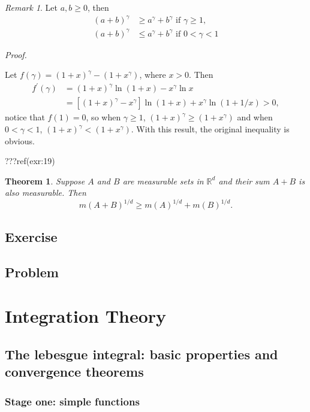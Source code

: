 \documentclass[
]{book}
\newtheorem{theorem}{Theorem}[chapter]
\theoremstyle{definition}
\theoremstyle{definition}
\theoremstyle{definition}
\theoremstyle{definition}
\theoremstyle{remark}
\newtheorem*{remark}{Remark}
\begin{document}
\begin{remark}
\leavevmode

Let \(a,b\ge0\), then
\[
\begin{aligned}
(a+b)^\gamma&\ge a^\gamma+b^\gamma\text{ if }\gamma\ge 1,\\
(a+b)^\gamma&\le a^\gamma+b^\gamma\text{ if }0<\gamma< 1
\end{aligned}
\]

\emph{Proof.}

Let \(f(\gamma)=(1+x)^\gamma-(1+x^\gamma)\), where \(x> 0\). Then
\[
\begin{aligned}
f^\prime (\gamma)&=(1+x)^\gamma\ln(1+x)-x^\gamma\ln x\\
&=[(1+x)^\gamma-x^\gamma]\ln(1+x)+x^\gamma\ln(1+1/x)>0,
\end{aligned}
\]
notice that \(f(1)=0\), so when \(\gamma\ge 1\), \((1+x)^\gamma\ge(1+x^\gamma)\) and when \(0<\gamma< 1\), \((1+x)^\gamma<(1+x^\gamma)\). With this result, the original inequality is obvious.

\end{remark}

???ref(exr:19)

\begin{theorem}
Suppose \(A\) and \(B\) are measurable sets in \(\mathbb{R}^d\) and their sum \(A+B\) is also measurable. Then
\[
m(A+B)^{1/d}\ge m(A)^{1/d}+m(B)^{1/d}.
\]
\end{theorem}

\section{Exercise}\label{exercise}

\section{Problem}\label{problem}

\chapter{Integration Theory}\label{ch2}

\section{The lebesgue integral: basic properties and convergence theorems}\label{the-lebesgue-integral-basic-properties-and-convergence-theorems}

\subsection{Stage one: simple functions}\label{stage-one-simple-functions}
\end{document}
